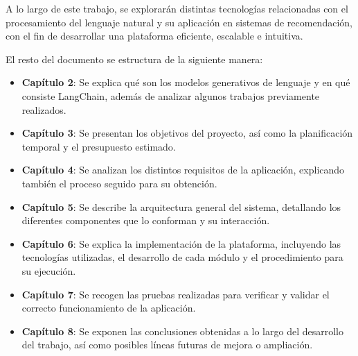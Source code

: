 A lo largo de este trabajo, se explorarán distintas tecnologías relacionadas con el procesamiento del lenguaje natural y su aplicación en sistemas de recomendación, con el fin de desarrollar una plataforma eficiente, escalable e intuitiva.



El resto del documento se estructura de la siguiente manera:

\begin{itemize}
	\item \textbf{Capítulo 2}: Se explica qué son los modelos generativos de lenguaje y en qué consiste LangChain, además de analizar algunos trabajos previamente realizados.
	
	\item \textbf{Capítulo 3}: Se presentan los objetivos del proyecto, así como la planificación temporal y el presupuesto estimado.
	
	\item \textbf{Capítulo 4}: Se analizan los distintos requisitos de la aplicación, explicando también el proceso seguido para su obtención.
	
	\item \textbf{Capítulo 5}: Se describe la arquitectura general del sistema, detallando los diferentes componentes que lo conforman y su interacción.
	
	\item \textbf{Capítulo 6}: Se explica la implementación de la plataforma, incluyendo las tecnologías utilizadas, el desarrollo de cada módulo y el procedimiento para su ejecución.
	
	\item \textbf{Capítulo 7}: Se recogen las pruebas realizadas para verificar y validar el correcto funcionamiento de la aplicación.
	
	\item \textbf{Capítulo 8}: Se exponen las conclusiones obtenidas a lo largo del desarrollo del trabajo, así como posibles líneas futuras de mejora o ampliación.
\end{itemize}







